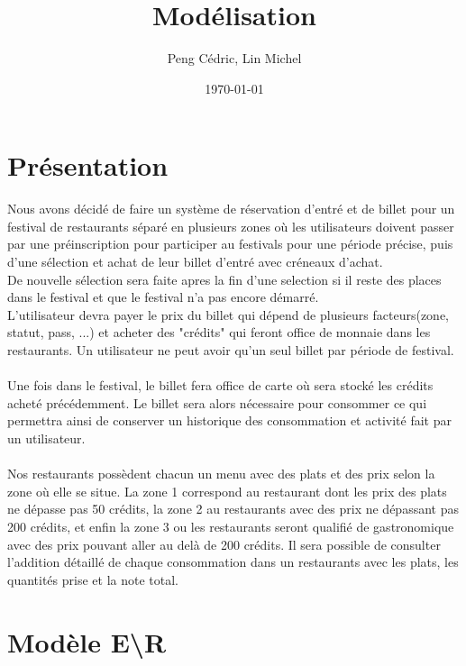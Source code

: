 \documentclass{article}
\title{Modélisation}
\author{Peng Cédric, Lin Michel}
\date{\today}
\begin{document}
\maketitle

\section{Présentation}
Nous avons décidé de faire un système de réservation d'entré et de billet pour un festival
de restaurants séparé en plusieurs zones où les utilisateurs doivent passer par une préinscription
pour participer au festivals pour une période précise, puis d'une sélection et achat de leur billet
d'entré avec créneaux d'achat.\\
De nouvelle sélection sera faite apres la fin d'une selection si il reste des places dans le festival et que le festival n'a pas encore démarré. \\
L'utilisateur devra payer le prix du billet qui dépend de plusieurs
facteurs(zone, statut, pass, ...) et acheter des "crédits" qui feront office de monnaie dans les restaurants. 
Un utilisateur ne peut avoir qu'un seul billet par période de festival.
\\
\\
Une fois dans le festival, le billet fera office de carte où
sera stocké les crédits acheté précédemment. Le billet sera alors nécessaire 
pour consommer ce qui permettra ainsi de conserver un historique des consommation et activité fait par un utilisateur. 
\\
\\
Nos restaurants possèdent chacun un menu avec des plats et des prix selon la zone où elle se situe. La zone 1 correspond au restaurant
dont les prix des plats ne dépasse pas 50 crédits, la zone 2 au restaurants avec des prix
ne dépassant pas 200 crédits, et enfin la zone 3 ou les restaurants seront qualifié de gastronomique avec des prix pouvant aller au delà de 200 crédits.
Il sera possible de consulter l'addition détaillé de chaque consommation dans un restaurants avec les plats, les quantités prise et la note total.


\section{Modèle E\textbackslash R}
\end{document}
